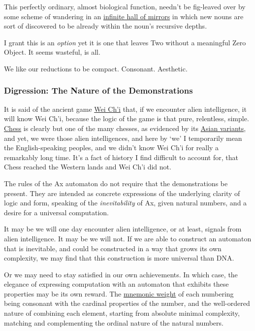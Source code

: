\documentclass[twoside]{article}
\begin{document}
This perfectly ordinary, almost biological function, needn't be fig-leaved over by some scheme of wandering in an \href{https://en.wikipedia.org/wiki/The_Library_of_Babel}{infinite hall of mirrors} in which new nouns are sort of discovered to be already within the noun's recursive depths.

I grant this is an \emph{option} yet it is one that leaves Two without a meaningful Zero Object. It seems wasteful, is all.

We like our reductions to be compact. Consonant. Aesthetic.

\subsubsection{Digression: The Nature of the Demonstrations}

It is said of the ancient game \href{https://en.wikipedia.org/wiki/Go_(game)}{Wei Ch'i} that, if we encounter alien intelligence, it will know Wei Ch'i, because the logic of the game is that pure, relentless, simple. \href{https://en.wikipedia.org/wiki/Chess}{Chess} is clearly but one of the many chesses, as evidenced by its \href{https://en.wikipedia.org/wiki/Shogi}{Asian variants}, and yet, we were those alien intelligences, and here by `we' I temporarily mean the English-speaking peoples, and we didn't know Wei Ch'i for really a remarkably long time. It's a fact of history I find difficult to account for, that Chess reached the Western lands and Wei Ch'i did not.

The rules of the Ax automaton do not require that the demonstrations be present. They are intended as concrete expressions of the underlying clarity of logic and form, speaking of the \emph{inevitability} of Ax, given natural numbers, and a desire for a universal computation.

It may be we will one day encounter alien intelligence, or at least, signals from alien intelligence. It may be we will not. If we are able to construct an automaton that is inevitable, and could be constructed in a way that grows its own complexity, we may find that this construction is more universal than DNA.

Or we may need to stay satisfied in our own achievements. In which case, the elegance of expressing computation with an automaton that exhibits these properties may be its own reward. The \href{https://en.wikipedia.org/wiki/Method_of_loci}{mnemonic weight} of each numbering being consonant with the cardinal properties of the number, and the well-ordered nature of combining each element, starting from absolute minimal complexity, matching and complementing the ordinal nature of the natural numbers.
\end{document}
